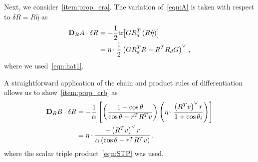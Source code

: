 \documentclass[letterpaper, 10 pt, conference]{ieeeconf}  %
\begin{document}
Next, we consider~\cref{item:prop_era}.
The variation of~\cref{eqn:A} is taken with respect to \( \delta R = R \hat \eta \) as
\begin{align*}
	\mathbf{D}_{R} A \cdot \delta R &= -\frac{1}{2} \mathrm{tr}\negthickspace\left[ G R_d^T \left( R \hat{\eta}\right) \right] \\
	&= \eta \cdot \frac{1}{2} \left( G R_d^T R - R^T R_d G\right)^\vee \, ,
\end{align*}
where we used~\cref{eqn:hat1}.

A straightforward application of the chain and product rules of differentiation allows us to show~\cref{item:prop_erb} as
\begin{align*}
	\mathbf{D}_{R} B \cdot \delta R &= -\frac{1}{\alpha} \left[\left(\frac{1+\cos \theta}{\cos \theta - r^T R^T v} \right) \left(\eta \cdot \frac{\left( R^T v\right)^\vee r}{1+\cos \theta_i} \right) \right]  \\
	&= \eta \cdot \frac{ - \left( R^T v\right)^\vee r}{\alpha \left(\cos \theta - r^T R^T v \right)} \, ,
\end{align*}
where the scalar triple product~\cref{eqn:STP} was used.
\end{document}
